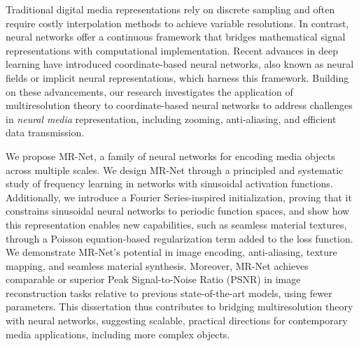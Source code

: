 Traditional digital media representations rely on discrete sampling and often require costly interpolation methods to achieve variable resolutions. In contrast, neural networks offer a continuous framework that bridges mathematical signal representations with computational implementation. Recent advances in deep learning have introduced coordinate-based neural networks, also known as neural fields or implicit neural representations, which harness this framework. Building on these advancements, our research investigates the application of multiresolution theory to coordinate-based neural networks to address challenges in \textit{neural media} representation, including zooming, anti-aliasing, and efficient data transmission.

We propose MR-Net, a family of neural networks for encoding media objects across multiple scales. We design MR-Net through a principled and systematic study of frequency learning in networks with sinusoidal activation functions. Additionally, we introduce a Fourier Series-inspired initialization, proving that it constrains sinusoidal neural networks to periodic function spaces, and show how this representation enables new capabilities, such as seamless material textures, through a Poisson equation-based regularization term added to the loss function. We demonstrate MR-Net's potential in image encoding, anti-aliasing, texture mapping, and seamless material synthesis. Moreover, MR-Net achieves comparable or superior Peak Signal-to-Noise Ratio (PSNR) in image reconstruction tasks relative to previous state-of-the-art models, using fewer parameters. This dissertation thus contributes to bridging multiresolution theory with neural networks, suggesting scalable, practical directions for contemporary media applications, including more complex objects.